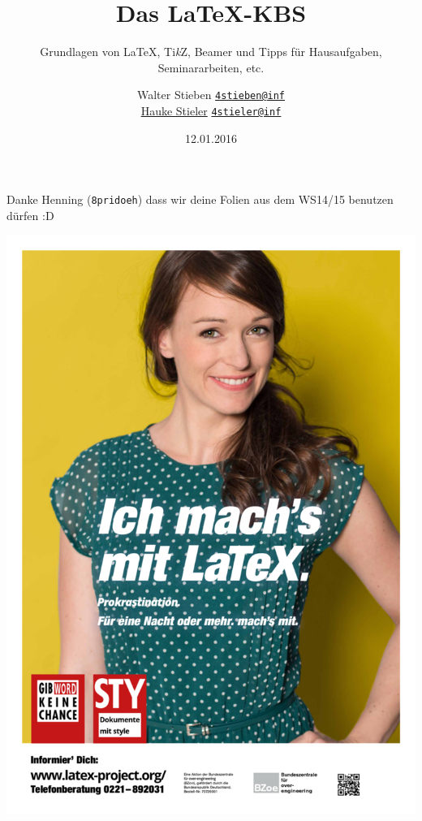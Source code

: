 \documentclass{beamer}
\title{Das \LaTeX-KBS}
\subtitle{\small Grundlagen von \LaTeX, Ti\textit{k}Z, Beamer und Tipps für Hausaufgaben, Seminararbeiten, etc.}
\author
{
	Walter Stieben \texttt{\href{mailto:4stieben@informatik.uni-hamburg.de}{4stieben@inf}}\\
	\href{http://hauke-stieler.de/}{Hauke Stieler} \texttt{\href{mailto:4stieler@informatik.uni-hamburg.de}{4stieler@inf}}
}
\date{\footnotesize 12.01.2016}
\begin{document}
	\maketitle
		
		
	\begin{frame}
		\begin{center}
			Danke Henning (\texttt{8pridoeh}) dass wir deine Folien aus dem WS14/15 benutzen dürfen :D
		\end{center}
	\end{frame}
		
		
	\begin{frame}
		\begin{minipage}[0.5\textheight]{0.5\textwidth}
			\tableofcontents[hideallsubsections]
		\end{minipage}
		\begin{minipage}{0.45\textwidth}
			\includegraphics[width=1.05\textwidth]{./images/gib-word-keine-chance}
		\end{minipage}
	\end{frame}
		
\end{document}
